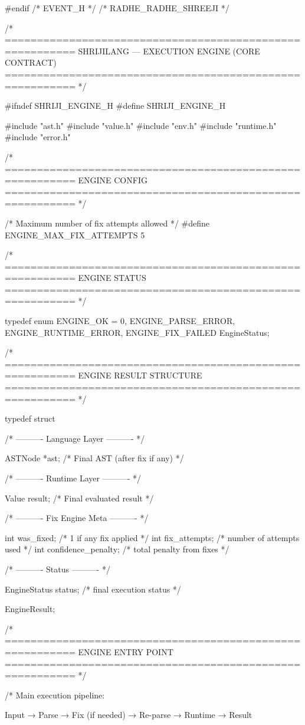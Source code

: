 \documentclass{article}
\begin{document}
#endif /* EVENT_H */
/* RADHE_RADHE_SHREEJI */

/* =========================================================
   SHRIJILANG — EXECUTION ENGINE (CORE CONTRACT)
   ========================================================= */

#ifndef SHRIJI_ENGINE_H
#define SHRIJI_ENGINE_H

#include "ast.h"
#include "value.h"
#include "env.h"
#include "runtime.h"
#include "error.h"

/* =========================================================
   ENGINE CONFIG
   ========================================================= */

/* Maximum number of fix attempts allowed */
#define ENGINE_MAX_FIX_ATTEMPTS 5

/* =========================================================
   ENGINE STATUS
   ========================================================= */

typedef enum
{
    ENGINE_OK = 0,
    ENGINE_PARSE_ERROR,
    ENGINE_RUNTIME_ERROR,
    ENGINE_FIX_FAILED
} EngineStatus;

/* =========================================================
   ENGINE RESULT STRUCTURE
   ========================================================= */

typedef struct
{
    /* ---------- Language Layer ---------- */

    ASTNode *ast;              /* Final AST (after fix if any) */

    /* ---------- Runtime Layer ---------- */

    Value result;              /* Final evaluated result */

    /* ---------- Fix Engine Meta ---------- */

    int was_fixed;             /* 1 if any fix applied */
    int fix_attempts;          /* number of attempts used */
    int confidence_penalty;    /* total penalty from fixes */

    /* ---------- Status ---------- */

    EngineStatus status;       /* final execution status */

} EngineResult;

/* =========================================================
   ENGINE ENTRY POINT
   ========================================================= */

/*
   Main execution pipeline:

   Input
     → Parse
     → Fix (if needed)
     → Re-parse
     → Runtime
     → Result
\end{document}
